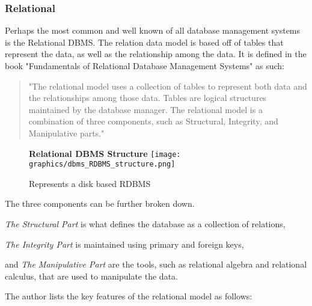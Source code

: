 \documentclass[letterpaper, 12pt]{article}
\begin{document}
\subsubsection{Relational}
Perhaps the most common and well known of all database management systems is the
Relational DBMS. The relation data model is based off of tables that represent 
the data, as well as the relationship among the data. It is defined in the book 
"Fundamentals of Relational Database Management Systems" as such:
\begin{quote}
"The relational model uses a collection of tables to represent both data and
the relationships among those data. Tables are logical structures maintained
by the database manager. The relational model is a combination of three
components, such as Structural, Integrity, and Manipulative parts."
\cite{sumathi2007fundamentals}
\end{quote}
\begin{figure}
  \centering
  \textbf{Relational DBMS Structure}
  \texttt{[image: graphics/dbms\_RDBMS\_structure.png]}
  \caption{Represents a disk based RDBMS}
\end{figure}
The three components can be further broken down.
\par\vspace{\baselineskip}
\textit{The Structural Part} is what defines the database as a collection of relations,
\par\vspace{\baselineskip}
\textit{The Integrity Part} is maintained using primary and foreign keys,
\par\vspace{\baselineskip}and 
\textit{The Manipulative Part} are the tools, such as relational algebra and 
relational calculus, that are used to manipulate the data.
\par\vspace{\baselineskip}
The author lists the key features of the relational model as follows: 
\end{document}
